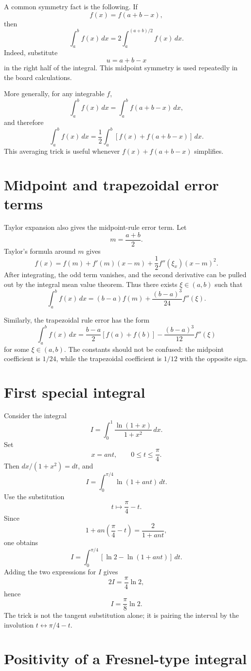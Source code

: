 A common symmetry fact is the following.  If
\[
  f(x)=f(a+b-x),
\]
then
\[
  \int_a^b f(x)\,dx
  =
  2\int_a^{(a+b)/2}f(x)\,dx.
\]
Indeed, substitute
\[
  u=a+b-x
\]
in the right half of the integral.  This midpoint symmetry is used repeatedly in the board calculations.

More generally, for any integrable $f$,
\[
  \int_a^b f(x)\,dx
  =
  \int_a^b f(a+b-x)\,dx,
\]
and therefore
\[
  \int_a^b f(x)\,dx
  =
\frac12\int_a^b [f(x)+f(a+b-x)]\,dx.
\]
This averaging trick is useful whenever $f(x)+f(a+b-x)$ simplifies.

\section{Midpoint and trapezoidal error terms}

Taylor expansion also gives the midpoint-rule error term.  Let
\[
  m=
\frac{a+b}{2}.
\]
Taylor's formula around $m$ gives
\[
  f(x)=f(m)+f'(m)(x-m)+
\frac12f''(\xi_x)(x-m)^2.
\]
After integrating, the odd term vanishes, and the second derivative can be pulled out by the integral mean value theorem.  Thus there exists $\xi\in(a,b)$ such that
\[
  \int_a^b f(x)\,dx
  =
  (b-a)f(m)+
\frac{(b-a)^3}{24}f''(\xi).
\]

Similarly, the trapezoidal rule error has the form
\[
  \int_a^b f(x)\,dx
  =
\frac{b-a}{2}[f(a)+f(b)]
  -
\frac{(b-a)^3}{12}f''(\xi)
\]
for some $\xi\in(a,b)$.  The constants should not be confused: the midpoint coefficient is $1/24$, while the trapezoidal coefficient is $1/12$ with the opposite sign.

\section{First special integral}

Consider the integral
\[
  I=\int_0^1
\frac{\ln(1+x)}{1+x^2}\,dx.
\]
Set
\[
  x=	an t,\qquad 0\le t\le
\frac\pi4.
\]
Then $dx/(1+x^2)=dt$, and
\[
  I=\int_0^{\pi/4}\ln(1+	an t)\,dt.
\]
Use the substitution
\[
  t\mapsto 
\frac\pi4-t.
\]
Since
\[
  1+	an\left(
\frac\pi4-t
\right)
  =
\frac2{1+	an t},
\]
one obtains
\[
  I=\int_0^{\pi/4}\left[\ln2-\ln(1+	an t)
\right]\,dt.
\]
Adding the two expressions for $I$ gives
\[
  2I=
\frac\pi4\ln2,
\]
hence
\[
  I=
\frac\pi8\ln2.
\]
The trick is not the tangent substitution alone; it is pairing the interval by the involution $t\leftrightarrow \pi/4-t$.

\section{Positivity of a Fresnel-type integral}

